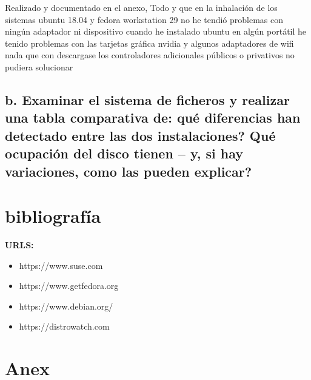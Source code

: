 \documentclass[preprint,11pt]{elsarticle}
\begin{document}
Realizado y documentado en el anexo, Todo y que en la inhalación de los sistemas ubuntu 18.04 y fedora workstation 29 no he tendió problemas con ningún adaptador ni dispositivo cuando he instalado ubuntu en algún portátil he tenido problemas con las tarjetas gráfica nvidia y algunos adaptadores de wifi nada que con descargase los controladores adicionales públicos o privativos no pudiera solucionar

\subsection{b. Examinar el sistema de ficheros y realizar una tabla comparativa de: qué
diferencias han detectado entre las dos instalaciones? Qué ocupación del
disco tienen – y, si hay variaciones, como las pueden explicar?
}


\clearpage
\section{bibliografía}
    \textbf{URLS:}
    \begin{itemize}
        \item https://www.suse.com
        \item https://www.getfedora.org
        \item https://www.debian.org/
        \item https://distrowatch.com
    \end{itemize}

\clearpage
\section{Anex}
\end{document}
